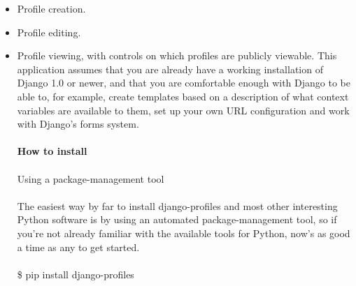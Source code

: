 \begin{itemize}
\item Profile creation.
\item Profile editing.
\item Profile viewing, with controls on which profiles are publicly viewable.
This application assumes that you are already have a working installation of Django 1.0 or newer, and that you are comfortable enough with Django to be able to, for example, create templates based on a description of what context variables are available to them, set up your own URL configuration and work with Django's forms system.\\\\
{\bf How to install}\\\\
Using a package-management tool\\\\
The easiest way by far to install django-profiles and most other interesting Python software is by using an automated package-management tool, so if you're not already familiar with the available tools for Python, now's as good a time as any to get started.\\\\
\$ pip install django-profiles
\end{itemize}
